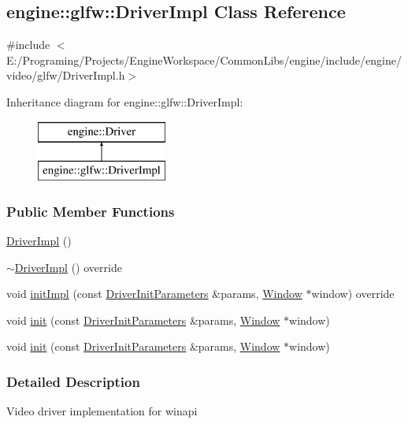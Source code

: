 \hypertarget{a00025}{}\subsection{engine\+:\+:glfw\+:\+:Driver\+Impl Class Reference}
\label{a00025}


{\ttfamily \#include $<$E\+:/\+Programing/\+Projects/\+Engine\+Workspace/\+Common\+Libs/engine/include/engine/video/glfw/\+Driver\+Impl.\+h$>$}

Inheritance diagram for engine\+:\+:glfw\+:\+:Driver\+Impl\+:\begin{figure}[H]
\begin{center}
\leavevmode
\includegraphics[height=2.000000cm]{a00025}
\end{center}
\end{figure}
\subsubsection*{Public Member Functions}
\begin{DoxyCompactItemize}
\item 
\hyperlink{a00025_a97b0fadb208251c7a998e0a1e2480a67}{Driver\+Impl} ()
\item 
\hyperlink{a00025_a18a74e07839478fede104c56a7ec73a1}{$\sim$\+Driver\+Impl} () override
\item 
void \hyperlink{a00025_ab25927deeb820162e36fe494e6abb357}{init\+Impl} (const \hyperlink{a00028}{Driver\+Init\+Parameters} \&params, \hyperlink{a00082}{Window} $\ast$window) override
\item 
void \hyperlink{a00024_a4e283b1274b6ffea595cb7329b09c16d}{init} (const \hyperlink{a00028}{Driver\+Init\+Parameters} \&params, \hyperlink{a00082}{Window} $\ast$window)
\item 
void \hyperlink{a00024_a4e283b1274b6ffea595cb7329b09c16d}{init} (const \hyperlink{a00028}{Driver\+Init\+Parameters} \&params, \hyperlink{a00082}{Window} $\ast$window)
\end{DoxyCompactItemize}


\subsubsection{Detailed Description}
Video driver implementation for winapi 

